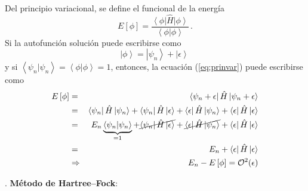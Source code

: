 \documentclass[10pt]{article}
\begin{document}
Del principio variacional, se define el funcional de la energía
\begin{equation}
 E[\phi] = \frac{\left< \phi \right| \hat{H} \left| \phi \right>}{\left< \phi | \phi \right>} \,.
 \label{eq:prinvar}
\end{equation}
Si la autofunción solución puede escribirse como
\begin{equation}
 \left|\phi\right>=\left|\psi_n\right>+\left|\epsilon\right>\,
\end{equation}
y si $\left<\psi_n|\psi_n\right>=\left<\phi|\phi\right>=1$, entonces, la ecuación
(\ref{eq:prinvar}) puede escribirse como
\begin{eqnarray}
 E\left[\phi\right] 
 &=& \left< \psi_n+\epsilon \right| \hat{H} \left| \psi_n+\epsilon \right>  \\
 &=& \left< \psi_n \right| \hat{H} \left| \psi_n \right> 
     + \left< \psi_n \right| \hat{H} \left| \epsilon \right> 
     + \left< \epsilon \right| \hat{H} \left| \psi_n \right> 
     + \left< \epsilon \right| \hat{H} \left| \epsilon \right> \\
 &=& E_n \underbrace{\left< \psi_n | \psi_n \right>}_{=1}
  + \cancel{\left< \psi_n \right| \hat{H} \left| \epsilon \right>} 
  + \cancel{\left< \epsilon \right| \hat{H} \left| \psi_n \right>} 
  + \left< \epsilon \right| \hat{H} \left| \epsilon \right> \\
 &=& E_n + \left< \epsilon \right| \hat{H} \left| \epsilon \right> \\
 &\Rightarrow& \quad
 E_n - E\left[\phi\right] = \mathcal{O}^2(\epsilon)
\end{eqnarray}

\vspace{0.5cm}
. {\bf Método de Hartree--Fock}:
\end{document}
